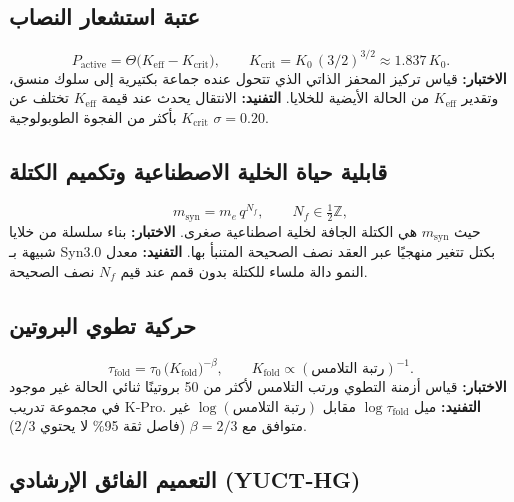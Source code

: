 \documentclass[11pt,a4paper]{article}
\begin{document}
	\subsection{عتبة استشعار النصاب}
	
	\begin{equation}\label{eq:pred-qs}
		P_{\mathrm{active}} =
		\Theta\!\bigl(K_{\mathrm{eff}} - K_{\mathrm{crit}}\bigr),\qquad
		K_{\mathrm{crit}} = K_0\,(3/2)^{3/2} \approx 1.837\,K_0 .
	\end{equation}
	\textbf{الاختبار:} قياس تركيز المحفز الذاتي الذي تتحول عنده جماعة بكتيرية إلى سلوك منسق، وتقدير \(K_{\mathrm{eff}}\) من الحالة الأيضية للخلايا.
	\textbf{التفنيد:} الانتقال يحدث عند قيمة \(K_{\mathrm{eff}}\) تختلف عن \(K_{\mathrm{crit}}\) بأكثر من الفجوة الطوبولوجية \(\sigma=0.20\).
	
	\subsection{قابلية حياة الخلية الاصطناعية وتكميم الكتلة}
	
	\begin{equation}\label{eq:pred-syn}
		m_{\mathrm{syn}} = m_e\,q^{N_f},\qquad N_f\in\tfrac12\mathbb{Z},
	\end{equation}
	حيث \(m_{\mathrm{syn}}\) هي الكتلة الجافة لخلية اصطناعية صغرى.
	\textbf{الاختبار:} بناء سلسلة من خلايا شبيهة بـ Syn3.0 بكتل تتغير منهجيًا عبر العقد نصف الصحيحة المتنبأ بها.
	\textbf{التفنيد:} معدل النمو دالة ملساء للكتلة بدون قمم عند قيم \(N_f\) نصف الصحيحة.
	
	\subsection{حركية تطوي البروتين}
	
	\begin{equation}\label{eq:pred-fold}
		\tau_{\mathrm{fold}} = \tau_0\,
		\bigl(K_{\mathrm{fold}}\bigr)^{-\beta},\qquad
		K_{\mathrm{fold}} \propto (\text{رتبة التلامس})^{-1}.
	\end{equation}
	\textbf{الاختبار:} قياس أزمنة التطوي ورتب التلامس لأكثر من 50 بروتينًا ثنائي الحالة غير موجود في مجموعة تدريب K‑Pro.
	\textbf{التفنيد:} ميل \(\log\tau_{\mathrm{fold}}\) مقابل \(\log(\text{رتبة التلامس})\) غير متوافق مع \(\beta=2/3\) (فاصل ثقة 95\% لا يحتوي \(2/3\)).
	
	\subsection{التعميم الفائق الإرشادي (YUCT‑HG)}
	
\end{document}
